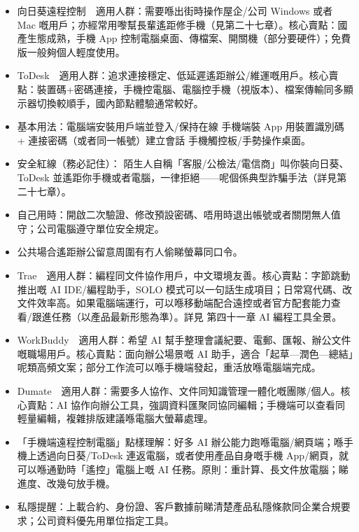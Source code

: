 \begin{itemize}
  \item 向日葵遠程控制　適用人群：需要喺出街時操作屋企/公司 Windows 或者 Mac 嘅用戶；亦經常用嚟幫長輩遙距修手機（見第二十七章）。核心賣點：國產生態成熟，手機 App 控制電腦桌面、傳檔案、開關機（部分要硬件）；免費版一般夠個人輕度使用。
  \item ToDesk　適用人群：追求連接穩定、低延遲遙距辦公/維運嘅用戶。核心賣點：裝置碼+密碼連接，手機控電腦、電腦控手機（視版本）、檔案傳輸同多顯示器切換較順手，國內節點體驗通常較好。
  \item 基本用法：電腦端安裝用戶端並登入/保持在線 手機端裝 App 用裝置識別碼 + 連接密碼（或者同一帳號）建立會話 手機觸控板/手勢操作桌面。
  \item 安全紅線（務必記住）： 陌生人自稱「客服/公檢法/電信商」叫你裝向日葵、ToDesk 並遙距你手機或者電腦，一律拒絕——呢個係典型詐騙手法（詳見第二十七章）。
  \item 自己用時：開啟二次驗證、修改預設密碼、唔用時退出帳號或者關閉無人值守；公司電腦遵守單位安全規定。
  \item 公共場合遙距辦公留意周圍有冇人偷睇螢幕同口令。
\end{itemize}


\begin{itemize}
  \item Trae　適用人群：編程同文件協作用戶，中文環境友善。核心賣點：字節跳動推出嘅 AI IDE/編程助手，SOLO 模式可以一句話生成項目；日常寫代碼、改文件效率高。如果電腦端運行，可以喺移動端配合遠控或者官方配套能力查看/跟進任務（以產品最新形態為準）。詳見 第四十一章 AI 編程工具全景。
  \item WorkBuddy　適用人群：希望 AI 幫手整理會議紀要、電郵、匯報、辦公文件嘅職場用戶。核心賣點：面向辦公場景嘅 AI 助手，適合「起草—潤色—總結」呢類高頻文案；部分工作流可以喺手機端發起，重活放喺電腦端完成。
  \item Dumate　適用人群：需要多人協作、文件同知識管理一體化嘅團隊/個人。核心賣點：AI 協作向辦公工具，強調資料匯聚同協同編輯；手機端可以查看同輕量編輯，複雜排版建議喺電腦大螢幕處理。
  \item 「手機端遠程控制電腦」點樣理解：好多 AI 辦公能力跑喺電腦/網頁端；喺手機上透過向日葵/ToDesk 連返電腦，或者使用產品自身嘅手機 App/網頁，就可以喺通勤時「遙控」電腦上嘅 AI 任務。原則：重計算、長文件放電腦；睇進度、改幾句放手機。
  \item 私隱提醒：上載合約、身份證、客戶數據前睇清楚產品私隱條款同企業合規要求；公司資料優先用單位指定工具。
\end{itemize}

